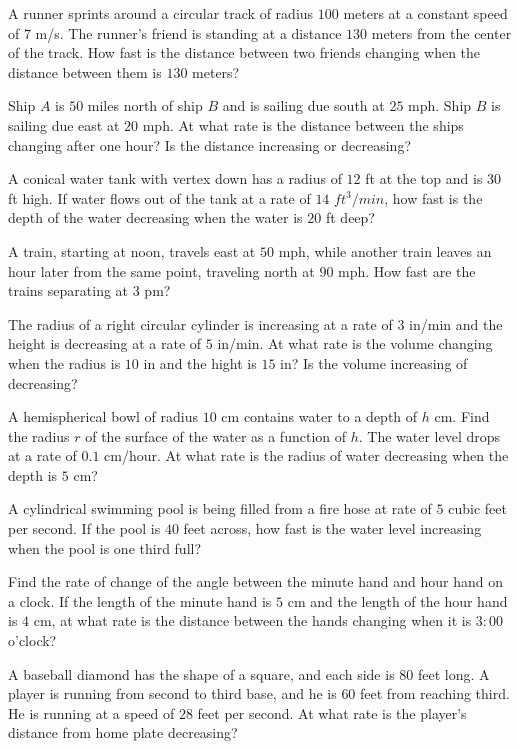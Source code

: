 \begin{multicols}{2}
\problem A runner sprints around a circular track of radius $100$ meters at
a constant speed of $7$ m/s. The runner's friend is standing at a distance
$130$ meters from the center of the track. How fast is the distance between
two friends changing when the distance between them is $130$ meters?



\problem Ship $A$ is $50$ miles north of ship $B$ and is sailing due south
at $25$ mph. Ship $B$ is sailing due east at $20$ mph. At what rate is the
distance between the ships changing after one hour? Is the distance
increasing or decreasing?



\problem A conical water tank with vertex down has a radius of $12$ ft at
the top and is $30$ ft high. If water flows out of the tank at a rate of
$14$ $ft^3/min$, how fast is the depth of the water decreasing when the
water is $20$ ft deep?



\problem A train, starting at noon, travels east at $50$ mph, while another
train leaves an hour later from the same point, traveling north at $90$ mph. How
fast are the trains separating at $3$ pm?



\problem The radius of a right circular cylinder is increasing at a rate of $3$
in/min and the height is decreasing at a rate of $5$ in/min. At what rate is the
volume changing when the radius is $10$ in and the hight is $15$ in? Is the
volume increasing of decreasing?



\problem A hemispherical bowl of radius $10$ cm contains water to a depth of $h$
cm. Find the radius $r$ of the surface of the water as a function of $h$. The
water level drops at a rate of $0.1$ cm/hour. At what rate is the radius of
water decreasing when the depth is $5$ cm?

\problem A cylindrical swimming pool is being filled from a fire hose at rate of
$5$ cubic feet per second.  If the pool is $40$ feet across, how fast is the
water level increasing when the pool is one third full?



\problem Find the rate of change of the angle between the minute hand and hour
hand on a clock. If the length of the minute hand is $5$ cm and the length of
the hour hand is $4$ cm, at what rate is the distance between the hands changing
when it is $3:00$ o'clock?

\problem A baseball diamond has the shape of a square, and each side is $80$
feet long. A player is running from second to third base, and he is $60$ feet
from reaching third. He is running at a speed of $28$ feet per second. At what
rate is the player's distance from home plate decreasing?


\end{multicols}
